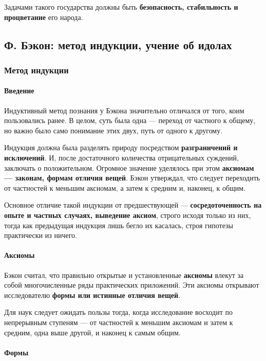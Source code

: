 \documentclass{article}
\begin{document}
\begin{flushleft}
Задачами такого государства должны быть \textbf{безопасность, стабильность и процветание} его народа.

\subsection{Ф. Бэкон: метод индукции, учение об идолах}

\subsubsection{Метод индукции}

\paragraph{Введение} Индуктивный метод познания у Бэкона значительно отличался от того, коим пользовались ранее. В целом, суть была одна — переход от частного к общему, но важно было само понимание этих двух, путь от одного к другому.

Индукция должна была разделять природу посредством \textbf{разграничений и исключений}. И, после достаточного количества отрицательных суждений, заключать о положительном. Огромное значение уделялось при этом \textbf{аксиомам — законам, формам отличия вещей}. Бэкон утверждал, что следует переходить от частностей к меньшим аксиомам, а затем к средним и, наконец, к общим.

Основное отличие такой индукции от предшествующей — \textbf{сосредоточенность на опыте и частных случаях, выведение аксиом}, строго исходя только из них, тогда как предыдущая индукция лишь бегло их касалась, строя гипотезы практически из ничего.

\paragraph{Аксиомы}

Бэкон считал, что правильно открытые и установленные \textbf{аксиомы} влекут за собой многочисленные ряды практических приложений. Эти аксиомы открывают исследователю \textbf{формы или истинные отличия вещей}.

Для наук следует ожидать пользы тогда, когда исследование восходит по непрерывным ступеням — от частностей к меньшим аксиомам и затем к средним, одна выше другой, и наконец к самым общим.

\paragraph{Формы}


\end{flushleft}
\end{document}
